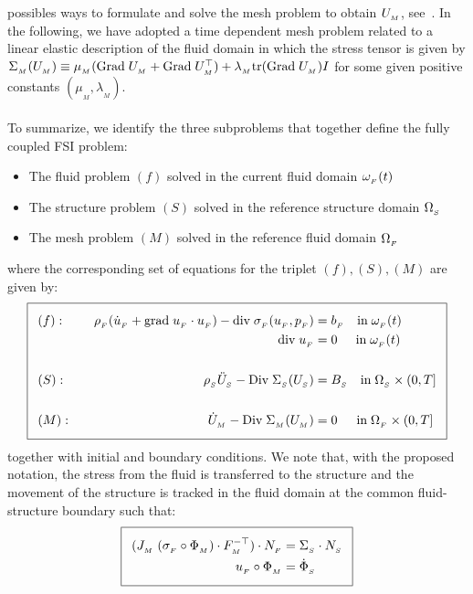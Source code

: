 possibles ways to formulate and solve the mesh problem to obtain
$U_{_{M}}$, see~\cite{HermanssonHansbo2003, LopezNigroStorti2008}.  In the
following, we have adopted a time dependent mesh problem related to a
linear elastic description of the fluid domain in which the stress
tensor is given by $\Sigma_{_{M}}(U_{_{M}})\equiv \mu_{{_M}}(\textrm{Grad}\;U_{_{M}} +
\textrm{Grad}\;U_{_{M}}^{\top})+ \lambda_{_{M}}\textrm{tr}(\textrm{Grad}\;U_{_{M}})I$ for some given
positive constants $(\mu_{{_M}},\lambda_{_{M}})$.
\\\\
To summarize, we identify the three subproblems that together define
the fully coupled FSI problem:
\begin{itemize}
\item
The fluid problem $(f)$ solved in the current fluid domain $\omega_{_{F}}(t)$
\item
The structure problem $(S)$ solved in the reference structure domain
$\Omega_{_{S}}$
\item
The mesh problem $(M)$ solved in the reference fluid domain $\Omega_{_{F}}$
\end{itemize}
where the corresponding set of equations for the triplet
$(f),(S),(M)$ are given by:
\begin{equation}
  \addtolength{\fboxsep}{5pt} \boxed{
    \begin{split}\label{selim:eq:FSIsystem}
   &(f):&\quad \rhoF(\dotuF + \graduF\cdot\uF) -
      \divv\sigmaF(\uF,\pF) =\;& \bff \quad
      \textrm{in}\;\oF(t)\\ &&\divv\uF =\;&
      0\:\:\quad\textrm{in}\;\oF(t) \\\\ &(S):&\quad \rhoS \ddotUS -
      \Divv \SigmaS(\US) =\;& \BS \quad \textrm{in}\; \OS\times
      (0,T]\\\\ &(M):&\quad \dot{U}_{_{M}} - \Divv \SigmaM(\UM) =\;& 0
  \;\:\quad\textrm{in}\; \OF\times (0,T]
    \end{split}
  }
\end{equation}
together with initial and boundary conditions. We note that, with the
proposed notation, the stress from the fluid is transferred to the
structure and the movement of the structure is tracked in the fluid
domain at the common fluid-structure boundary such that:
\begin{equation}
  \addtolength{\fboxsep}{5pt} \boxed{
    \begin{split}\label{selim:eq:ALEtraction}
    (J_{_{M}}\;(\sigmaF\circ\PhiM) \cdot F_{_{M}}^{-\top})\cdot N_{_{F}}
      &= \SigmaS\cdot N_{_{S}}\\ \uF\circ\PhiM &= \dot{\Phi}_{_{S}}
    \end{split}
  }
\end{equation}
